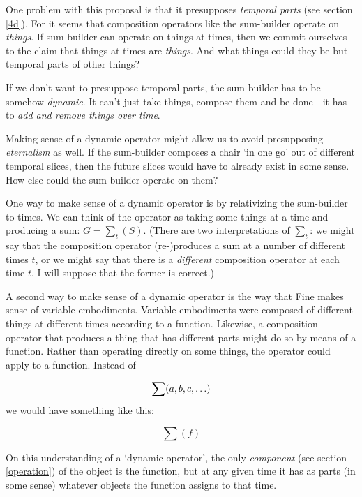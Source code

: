 \documentclass[11pt]{article}
\begin{document}
\begin{spacing}{1.5}
One problem with this proposal is that it presupposes {\em temporal
  parts} (see section \ref{4d}).  For it seems that composition
operators like the sum-builder operate on {\em things}.  If
sum-builder can operate on things-at-times, then we commit ourselves
to the claim that things-at-times are {\em things}.  And what things
could they be but temporal parts of other things?

If we don't want to presuppose temporal parts, the sum-builder has to
be somehow \emph{dynamic}. It can't just take things, compose them and
be done---it has to \emph{add and remove things over time}.

Making sense of a dynamic operator might allow us to avoid
presupposing {\em eternalism} as well.  If the sum-builder composes a
chair `in one go' out of different temporal slices, then the future
slices would have to already exist in some sense.  How else could the
sum-builder operate on them?

One way to make sense of a dynamic operator is by relativizing the
sum-builder to times.  We can think of the operator as taking some
things at a time and producing a sum: $G = \sum _{t} (S)$.  (There are
two interpretations of $\sum _{t}$: we might say that the composition
operator (re-)produces a sum at a number of different times $t$, or we
might say that there is a {\em different} composition operator at each
time $t$.  I will suppose that the former is correct.)

A second way to make sense of a dynamic operator is the way that Fine
makes sense of variable embodiments.  Variable embodiments were
composed of different things at different times according to a
function.  Likewise, a composition operator that produces a thing that
has different parts might do so by means of a function.  Rather than
operating directly on some things, the operator could apply to a
function.  Instead of

\begin{displaymath}
\sum (a, b, c, \mathellipsis )
\end{displaymath}
we would have something like this:

\begin{displaymath}
\sum ( f )
\end{displaymath}

On this understanding of a `dynamic operator', the only {\em
  component} (see section \ref{operation}) of the object is the
function, but at any given time it has as parts (in some sense)
whatever objects the function assigns to that time.


\end{spacing}
\end{document}

